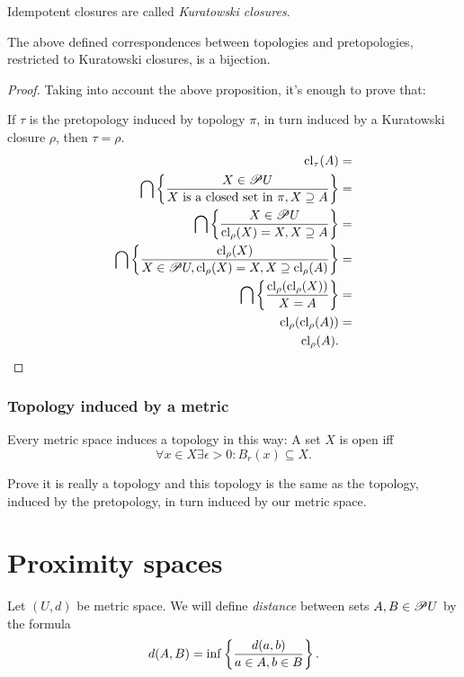 \begin{defn}
Idempotent closures are called \emph{Kuratowski
closures}.\end{defn}
\begin{thm}
The above defined correspondences between topologies and pretopologies,
restricted to Kuratowski closures, is a bijection.\end{thm}
\begin{proof}
Taking into account the above proposition, it's enough to prove that:

If $\tau$ is the pretopology induced by topology $\pi$, in turn
induced by a Kuratowski closure $\rho$, then $\tau=\rho$.
\begin{align*}
\operatorname{cl}_{\tau}(A) & =\\
\bigcap\left\{ \frac{X\in\mathscr{P} U}{X\text{ is a closed set in }\pi,X\supseteq A}\right\} & =\\
\bigcap\left\{ \frac{X\in\mathscr{P} U}{\operatorname{cl}_{\rho}(X)=X,X\supseteq A}\right\} & =\\
\bigcap\left\{ \frac{\operatorname{cl}_{\rho}(X)}{X\in\mathscr{P} U,\operatorname{cl}_{\rho}(X)=X,X\supseteq\operatorname{cl}_{\rho}(A)}\right\} & =\\
\bigcap\left\{ \frac{\operatorname{cl}_{\rho}(\operatorname{cl}_{\rho}(X))}{X=A}\right\} & =\\
\operatorname{cl}_{\rho}(\operatorname{cl}_{\rho}(A)) & =\\
\operatorname{cl}_{\rho}(A).
\end{align*}

\end{proof}

\subsubsection{Topology induced by a metric}
\begin{defn}
Every metric space induces a topology in this way: A set $X$ is open
iff
\[
\forall x\in X\exists\epsilon>0:B_{r}(x)\subseteq X.
\]
\end{defn}
\begin{xca}
Prove it is really a topology and this topology is the same as the
topology, induced by the pretopology, in turn induced by our metric
space.
\end{xca}

\section{\label{sec-prox}Proximity spaces}

Let $(U,d)$ be metric space. We will define \emph{distance} between
sets $A,B\in\mathscr{P} U$ by the formula
\[
d(A,B)=\inf\left\{ \frac{d(a,b)}{a\in A,b\in B}\right\}.
\]


